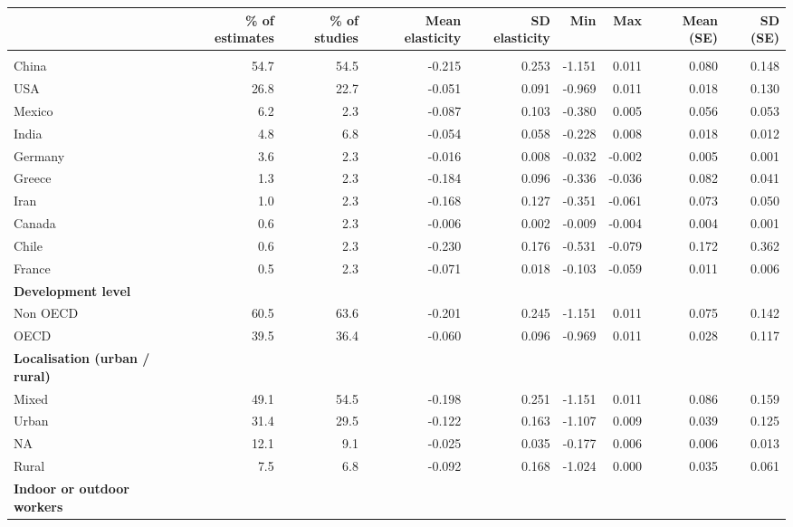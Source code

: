 \documentclass[
]{article}
\begin{document}
\begin{table}[t]
\fontsize{8.0pt}{10.0pt}\selectfont
\begin{tabular*}{\linewidth}{@{\extracolsep{\fill}}l|rrrrrrrr}
\toprule
 & \% of estimates & \% of studies & Mean elasticity & SD elasticity & Min & Max & Mean (SE) & SD (SE) \\ 
\midrule\addlinespace[2.5pt]
{\bfseries Country} &  &  & {} &  &  &  &  &  \\ 
   China & 54.7 & 54.5 & {-0.215} & 0.253 & -1.151 & 0.011 & 0.080 & 0.148 \\ 
   USA & 26.8 & 22.7 & {-0.051} & 0.091 & -0.969 & 0.011 & 0.018 & 0.130 \\ 
   Mexico & 6.2 & 2.3 & {-0.087} & 0.103 & -0.380 & 0.005 & 0.056 & 0.053 \\ 
   India & 4.8 & 6.8 & {-0.054} & 0.058 & -0.228 & 0.008 & 0.018 & 0.012 \\ 
   Germany & 3.6 & 2.3 & {-0.016} & 0.008 & -0.032 & -0.002 & 0.005 & 0.001 \\ 
   Greece & 1.3 & 2.3 & {-0.184} & 0.096 & -0.336 & -0.036 & 0.082 & 0.041 \\ 
   Iran & 1.0 & 2.3 & {-0.168} & 0.127 & -0.351 & -0.061 & 0.073 & 0.050 \\ 
   Canada & 0.6 & 2.3 & {-0.006} & 0.002 & -0.009 & -0.004 & 0.004 & 0.001 \\ 
   Chile & 0.6 & 2.3 & {-0.230} & 0.176 & -0.531 & -0.079 & 0.172 & 0.362 \\ 
   France & 0.5 & 2.3 & {-0.071} & 0.018 & -0.103 & -0.059 & 0.011 & 0.006 \\ 
{\bfseries Development level} &  &  & {} &  &  &  &  &  \\ 
   Non OECD & 60.5 & 63.6 & {-0.201} & 0.245 & -1.151 & 0.011 & 0.075 & 0.142 \\ 
   OECD & 39.5 & 36.4 & {-0.060} & 0.096 & -0.969 & 0.011 & 0.028 & 0.117 \\ 
{\bfseries Localisation (urban / rural)} &  &  & {} &  &  &  &  &  \\ 
   Mixed & 49.1 & 54.5 & {-0.198} & 0.251 & -1.151 & 0.011 & 0.086 & 0.159 \\ 
   Urban & 31.4 & 29.5 & {-0.122} & 0.163 & -1.107 & 0.009 & 0.039 & 0.125 \\ 
   NA & 12.1 & 9.1 & {-0.025} & 0.035 & -0.177 & 0.006 & 0.006 & 0.013 \\ 
   Rural & 7.5 & 6.8 & {-0.092} & 0.168 & -1.024 & 0.000 & 0.035 & 0.061 \\ 
{\bfseries Indoor or outdoor workers} &  &  & {} &  &  &  &  &  \\ 

\end{tabular*}
\end{table}
\end{document}
